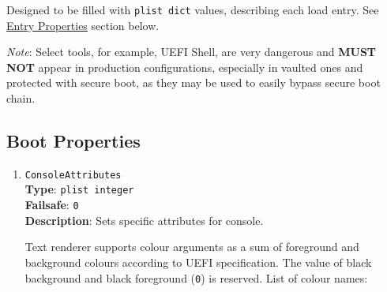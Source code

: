\documentclass[]{article}
\begin{document}
\begin{enumerate}
  Designed to be filled with \texttt{plist\ dict} values, describing each load entry.
  See \hyperref[miscentryprops]{Entry Properties} section below.

  \emph{Note}: Select tools, for example, UEFI Shell, are very
  dangerous and \textbf{MUST NOT} appear in production configurations, especially
  in vaulted ones and protected with secure boot, as they may be used to easily
  bypass secure boot chain.

\end{enumerate}

\subsection{Boot Properties}\label{miscbootprops}

\begin{enumerate}

\item
  \texttt{ConsoleAttributes}\\
  \textbf{Type}: \texttt{plist\ integer}\\
  \textbf{Failsafe}: \texttt{0}\\
  \textbf{Description}: Sets specific attributes for console.

  Text renderer supports colour arguments as a sum of foreground and background
  colours according to UEFI specification. The value of black background and
  black foreground (\texttt{0}) is reserved. List of colour names:


\end{enumerate}
\end{document}
